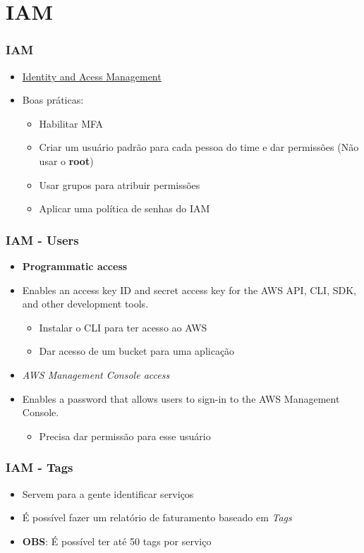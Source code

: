 \section{IAM}

\begin{frame}
	\frametitle{IAM}
	\begin{itemize}
		\item \href{https://docs.aws.amazon.com/wellarchitected/latest/security-pillar/identity-and-access-management.html}{Identity and Acess Management}
		\item Boas práticas:
			\begin{itemize}
				\item Habilitar MFA
				\item Criar um usuário padrão para cada pessoa do time e dar permissões (Não usar o \textbf{root})
				\item Usar grupos para atribuir permissões
				\item Aplicar uma política de senhas do IAM
			\end{itemize}
	\end{itemize}
\end{frame}

\begin{frame}
	\frametitle{IAM - Users}
	\begin{itemize}
		\item \textbf{Programmatic access}
		\item Enables an access key ID and secret access key for the AWS API, CLI, SDK, and other development tools.
		\begin{itemize}
			\item Instalar o CLI para ter acesso ao AWS
			\item Dar acesso de um bucket para uma aplicação
		\end{itemize}
		\item \textit{AWS Management Console access}
		\item Enables a password that allows users to sign-in to the AWS Management Console.
		\begin{itemize}
			\item Precisa dar permissão para esse usuário
		\end{itemize}
	\end{itemize}
\end{frame}

\begin{frame}
	\frametitle{IAM - Tags}
	\begin{itemize}
		\item Servem para a gente identificar serviços
		\item É possível fazer um relatório de faturamento baseado em \textit{Tags}
		\item \textbf{OBS}: É possível ter até 50 tags por serviço
	\end{itemize}
\end{frame}

